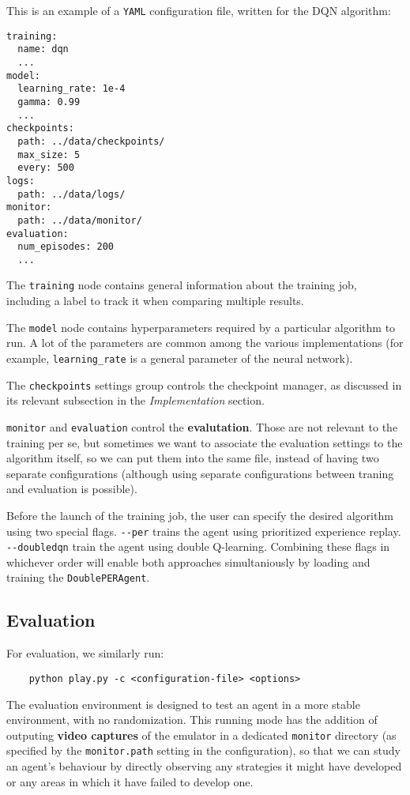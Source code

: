 This is an example of a \verb|YAML| configuration file, written for the DQN algorithm:
\begin{verbatim}
training:
  name: dqn
  ...
model:
  learning_rate: 1e-4
  gamma: 0.99
  ...
checkpoints:
  path: ../data/checkpoints/
  max_size: 5
  every: 500
logs:
  path: ../data/logs/
monitor:
  path: ../data/monitor/
evaluation:
  num_episodes: 200
  ...
\end{verbatim}

The \verb|training| node contains general information about the training job, including a label to track it when comparing multiple results.

The \verb|model| node contains hyperparameters required by a particular algorithm to run.
A lot of the parameters are common among the various implementations (for example, \verb|learning_rate| is a general parameter of the neural network).

The \verb|checkpoints| settings group controls the checkpoint manager, as discussed in its relevant subsection in the \emph{Implementation} section.

\verb|monitor| and \verb|evaluation| control the \textbf{evalutation}. Those are not relevant to the training per se, but sometimes we want to associate the evaluation settings to the algorithm itself, so we can put them into the same file, instead of having two separate configurations (although using separate configurations between traning and evaluation is possible).

Before the launch of the training job, the user can specify the desired algorithm using two special flags.
\verb|--per| trains the agent using prioritized experience replay.
\verb|--doubledqn| train the agent using double Q-learning.
Combining these flags in whichever order will enable both approaches simultaniously by loading and training the \verb|DoublePERAgent|.

\subsection*{Evaluation}
For evaluation, we similarly run:
\begin{verbatim}
    python play.py -c <configuration-file> <options>
\end{verbatim}

The evaluation environment is designed to test an agent in a more stable environment, with no randomization.
This running mode has the addition of outputing \textbf{video captures} of the emulator in a dedicated \verb|monitor| directory (as specified by the \verb|monitor.path| setting in the configuration), so that we can study an agent's behaviour by directly observing any strategies it might have developed or any areas in which it have failed to develop one.

